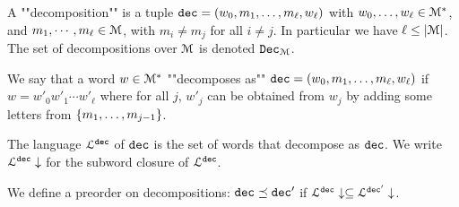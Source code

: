 \begin{definition}
	A ""decomposition"" is a tuple $\mathtt{dec} = (w_0, m_1, \ldots, m_\ell, w_\ell)$ with $w_0, \ldots, w_\ell \in \mathcal{M}^*$, and $m_1, \cdots, m_\ell \in \mathcal{M}$, with $m_i \neq m_j$ for all $i\neq j$. In particular we have $\ell \leq |\mathcal{M}|$. The set of decompositions over $\mathcal{M}$ is denoted $\mathtt{Dec}_{\mathcal{M}}$.
	
	We say that a word $w \in \mathcal{M}^*$ ""decomposes as"" $\mathtt{dec} = (w_0, m_1, \ldots, m_\ell, w_\ell)$ if $w = w'_0 w'_1 \cdots w'_\ell$ where for all $j$, $w'_j$ can be obtained from $w_j$ by adding some letters from $\{m_1, \ldots, m_{j-1}\}$.
	
	The language $\mathcal{L}^{\mathtt{\mathtt{dec}}}$ of $\mathtt{dec}$ is the set of words that decompose as $\mathtt{dec}$. We write $\mathcal{L}^{\mathtt{\mathtt{dec}}}\downarrow$ for the subword closure of $\mathcal{L}^{\mathtt{\mathtt{dec}}}$.
	
	We define a preorder on decompositions:
	$\mathtt{dec} \preceq \mathtt{dec}'$ if $\mathcal{L}^{\mathtt{\mathtt{dec}}}\downarrow \subseteq \mathcal{L}^{\mathtt{\mathtt{dec}'}}\downarrow$. 
\end{definition}



